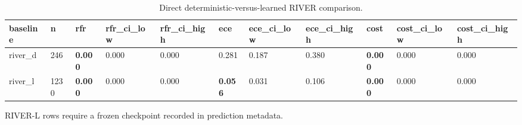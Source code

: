 \begin{table}
\centering
\caption{Direct deterministic-versus-learned RIVER comparison.}
\begin{tabular}{lllllllllll}
baseline & n & rfr & rfr\_ci\_low & rfr\_ci\_high & ece & ece\_ci\_low & ece\_ci\_high & cost & cost\_ci\_low & cost\_ci\_high \\ \hline
river\_d & 246 & \textbf{0.000} & 0.000 & 0.000 & 0.281 & 0.187 & 0.380 & \textbf{0.000} & 0.000 & 0.000 \\
river\_l & 1230 & \textbf{0.000} & 0.000 & 0.000 & \textbf{0.056} & 0.031 & 0.106 & \textbf{0.000} & 0.000 & 0.000 \\
\end{tabular}
\footnotesize{RIVER-L rows require a frozen checkpoint recorded in prediction metadata.}
\end{table}

